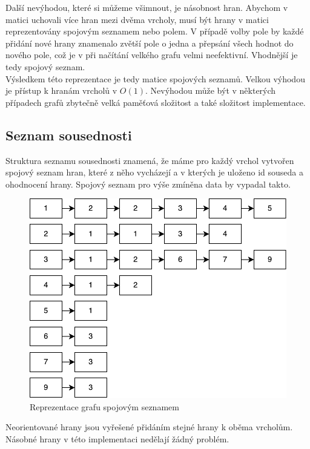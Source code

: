 \documentclass[
12pt,
a4paper,
pdftex,
czech,
titlepage
]{report}
\begin{document}
Další nevýhodou, které si můžeme všimnout, je násobnost hran. Abychom v matici uchovali více hran mezi dvěma vrcholy, musí být hrany v matici reprezentovány spojovým seznamem nebo polem. V případě volby pole by každé přidání nové hrany znamenalo zvětší pole o jedna a přepsání všech hodnot do nového pole, což je v při načítání velkého grafu velmi neefektivní. Vhodnější je tedy spojový seznam.\\

Výsledkem této reprezentace je tedy matice spojových seznamů. Velkou výhodou je přístup k hranám vrcholů v $O(1)$. Nevýhodou může být v některých případech grafů zbytečně velká paměťová složitost a také složitost implementace.


\subsection{Seznam sousednosti}
Struktura seznamu sousednosti znamená, že máme pro každý vrchol vytvořen spojový seznam hran, které z něho vycházejí a v kterých je uloženo id souseda a ohodnocení hrany. Spojový seznam pro výše zmíněna data by vypadal takto.\\

\begin{figure}[!h]
	\centering
	 \includegraphics[scale=0.5]{spojak.pdf}
	\caption{Reprezentace grafu spojovým seznamem}
\end{figure}

Neorientované hrany jsou vyřešené přidáním stejné hrany k oběma vrcholům. Násobné hrany v této implementaci nedělají žádný problém.\\
\end{document}
